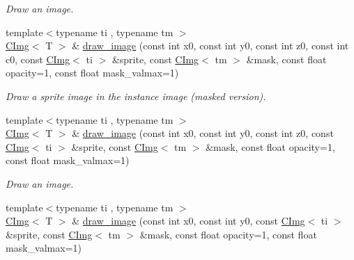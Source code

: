 \begin{DoxyCompactItemize}
\begin{DoxyCompactList}\small\item\em Draw an image. \item\end{DoxyCompactList}\item 
{\footnotesize template$<$typename ti , typename tm $>$ }\\\hyperlink{structcimg__library_1_1CImg}{CImg}$<$ T $>$ \& \hyperlink{structcimg__library_1_1CImg_a370b11f3f3bf1c3be720a5c7771549d4}{draw\_\-image} (const int x0, const int y0, const int z0, const int c0, const \hyperlink{structcimg__library_1_1CImg}{CImg}$<$ ti $>$ \&sprite, const \hyperlink{structcimg__library_1_1CImg}{CImg}$<$ tm $>$ \&mask, const float opacity=1, const float mask\_\-valmax=1)
\begin{DoxyCompactList}\small\item\em Draw a sprite image in the instance image (masked version). \item\end{DoxyCompactList}\item 
\hypertarget{structcimg__library_1_1CImg_a6bc3dd141f888d66aafbacbd6c2b57cb}{
{\footnotesize template$<$typename ti , typename tm $>$ }\\\hyperlink{structcimg__library_1_1CImg}{CImg}$<$ T $>$ \& \hyperlink{structcimg__library_1_1CImg_a6bc3dd141f888d66aafbacbd6c2b57cb}{draw\_\-image} (const int x0, const int y0, const int z0, const \hyperlink{structcimg__library_1_1CImg}{CImg}$<$ ti $>$ \&sprite, const \hyperlink{structcimg__library_1_1CImg}{CImg}$<$ tm $>$ \&mask, const float opacity=1, const float mask\_\-valmax=1)}
\label{structcimg__library_1_1CImg_a6bc3dd141f888d66aafbacbd6c2b57cb}

\begin{DoxyCompactList}\small\item\em Draw an image. \item\end{DoxyCompactList}\item 
\hypertarget{structcimg__library_1_1CImg_a77017d588585db4fb4149a0ddd09538b}{
{\footnotesize template$<$typename ti , typename tm $>$ }\\\hyperlink{structcimg__library_1_1CImg}{CImg}$<$ T $>$ \& \hyperlink{structcimg__library_1_1CImg_a77017d588585db4fb4149a0ddd09538b}{draw\_\-image} (const int x0, const int y0, const \hyperlink{structcimg__library_1_1CImg}{CImg}$<$ ti $>$ \&sprite, const \hyperlink{structcimg__library_1_1CImg}{CImg}$<$ tm $>$ \&mask, const float opacity=1, const float mask\_\-valmax=1)}
\label{structcimg__library_1_1CImg_a77017d588585db4fb4149a0ddd09538b}


\end{DoxyCompactItemize}
